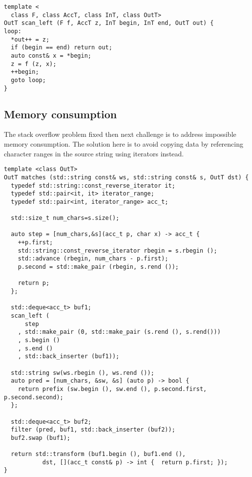 \documentclass{article}
\begin{document}
\begin{verbatim}
template <
  class F, class AccT, class InT, class OutT>
OutT scan_left (F f, AccT z, InT begin, InT end, OutT out) {
loop:
  *out++ = z;
  if (begin == end) return out;
  auto const& x = *begin;
  z = f (z, x);
  ++begin;
  goto loop;
}
\end{verbatim}

\subsection{Memory consumption}
The stack overflow problem fixed then next challenge is to address
impossible memory consumption. The solution here is to avoid copying
data by referencing character ranges in the source string using
iterators instead.
\begin{verbatim}
template <class OutT>
OutT matches (std::string const& ws, std::string const& s, OutT dst) {
  typedef std::string::const_reverse_iterator it;
  typedef std::pair<it, it> iterator_range;
  typedef std::pair<int, iterator_range> acc_t;

  std::size_t num_chars=s.size();

  auto step = [num_chars,&s](acc_t p, char x) -> acc_t {
    ++p.first;
    std::string::const_reverse_iterator rbegin = s.rbegin ();
    std::advance (rbegin, num_chars - p.first);
    p.second = std::make_pair (rbegin, s.rend ());

    return p;
  };

  std::deque<acc_t> buf1;
  scan_left (
      step
    , std::make_pair (0, std::make_pair (s.rend (), s.rend()))
    , s.begin ()
    , s.end ()
    , std::back_inserter (buf1));

  std::string sw(ws.rbegin (), ws.rend ());
  auto pred = [num_chars, &sw, &s] (auto p) -> bool { 
    return prefix (sw.begin (), sw.end (), p.second.first, p.second.second); 
  };

  std::deque<acc_t> buf2;
  filter (pred, buf1, std::back_inserter (buf2));
  buf2.swap (buf1);

  return std::transform (buf1.begin (), buf1.end (), 
           dst, [](acc_t const& p) -> int {  return p.first; });
}
\end{verbatim}
\end{document}
